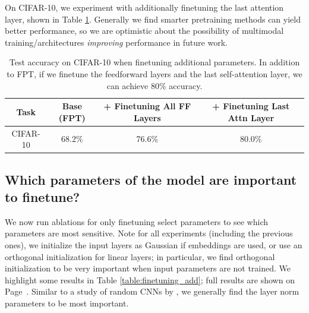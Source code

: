 On CIFAR-10, we experiment with additionally finetuning the last attention layer, shown in Table \ref{table:morelayers}.
Generally we find smarter pretraining methods can yield better performance, so we are optimistic about the possibility of multimodal training/architectures \emph{improving} performance in future work.

\begin{table}[H] 
\begin{center}
\begin{tabular}{cccc}
\toprule
\textbf{Task} & \multicolumn{1}{c}{\bf Base (FPT)} & \multicolumn{1}{c}{\bf + Finetuning All FF Layers} & \multicolumn{1}{c}{\bf + Finetuning Last Attn Layer} \\
\midrule
CIFAR-10 & 68.2\% & 76.6\% & 80.0\% \\
\bottomrule
\end{tabular}
\end{center}
\caption{Test accuracy on CIFAR-10 when finetuning additional parameters. In addition to FPT, if we finetune the feedforward layers and the last self-attention layer, we can achieve 80\% accuracy. }\label{table:morelayers}
\end{table}

\subsection{Which parameters of the model are important to finetune?}
\label{sec:params}

We now run ablations for only finetuning select parameters to see which parameters are most sensitive.
Note for all experiments (including the previous ones), we initialize the input layers as Gaussian if embeddings are used, or use an orthogonal initialization for linear layers; in particular, we find orthogonal initialization to be very important when input parameters are not trained.
We highlight some results in Table \ref{table:finetuning_add}; full results are shown on Page~\pageref{table:finetuning_indep}.
Similar to a study of random CNNs by \cite{frankle2020batchnorm}, we generally find the layer norm parameters to be most important.

